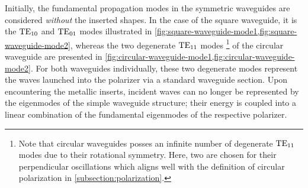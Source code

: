 \documentclass[14pt,a4paper]{ntust_report}
\begin{document}
Initially, the fundamental propagation modes in the symmetric waveguides are considered \emph{without} the inserted shapes. In the case of the square waveguide, it is the $\text{TE}_{10}$ and $\text{TE}_{01}$ modes illustrated in \cref{fig:square-waveguide-mode1,fig:square-waveguide-mode2}, whereas the two degenerate $\text{TE}_{11}$ modes%
    \footnote{Note that circular waveguides posses an infinite number of degenerate $\text{TE}_{11}$ modes due to their rotational symmetry. Here, two are chosen for their perpendicular oscillations which aligns well with the definition of circular polarization in \cref{subsection:polarization}.}
of the circular waveguide are presented in \cref{fig:circular-waveguide-mode1,fig:circular-waveguide-mode2}. For both waveguides individually, these two degenerate modes represent the waves launched into the polarizer via a standard waveguide section. Upon encountering the metallic inserts, incident waves can no longer be represented by the eigenmodes of the simple waveguide structure; their energy is coupled into a linear combination of the fundamental eigenmodes of the respective polarizer.
\end{document}
